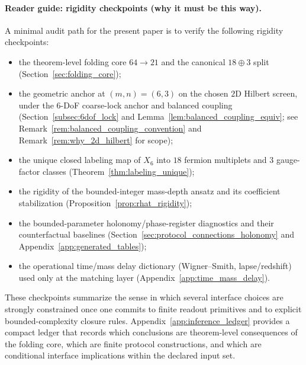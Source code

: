 \paragraph{Reader guide: rigidity checkpoints (why it must be this way).}
A minimal audit path for the present paper is to verify the following rigidity checkpoints:
\begin{itemize}
\item the theorem-level folding core $64\to 21$ and the canonical $18\oplus 3$ split (Section~\ref{sec:folding_core});
\item the geometric anchor at $(m,n)=(6,3)$ on the chosen $2$D Hilbert screen, under the 6-DoF coarse-lock anchor and balanced coupling (Section~\ref{subsec:6dof_lock} and Lemma~\ref{lem:balanced_coupling_equiv}; see Remark~\ref{rem:balanced_coupling_convention} and Remark~\ref{rem:why_2d_hilbert} for scope);
\item the unique closed labeling map of $X_6$ into $18$ fermion multiplets and $3$ gauge-factor classes (Theorem~\ref{thm:labeling_unique});
\item the rigidity of the bounded-integer mass-depth ansatz and its coefficient stabilization (Proposition~\ref{prop:rhat_rigidity});
\item the bounded-parameter holonomy/phase-register diagnostics and their counterfactual baselines (Section~\ref{sec:protocol_connections_holonomy} and Appendix~\ref{app:generated_tables});
\item the operational time/mass delay dictionary (Wigner--Smith, lapse/redshift) used only at the matching layer (Appendix~\ref{app:time_mass_delay}).
\end{itemize}
These checkpoints summarize the sense in which several interface choices are strongly constrained once one commits to finite readout primitives and to explicit bounded-complexity closure rules.
Appendix~\ref{app:inference_ledger} provides a compact ledger that records which conclusions are theorem-level consequences of the folding core, which are finite protocol constructions, and which are conditional interface implications within the declared input set.


